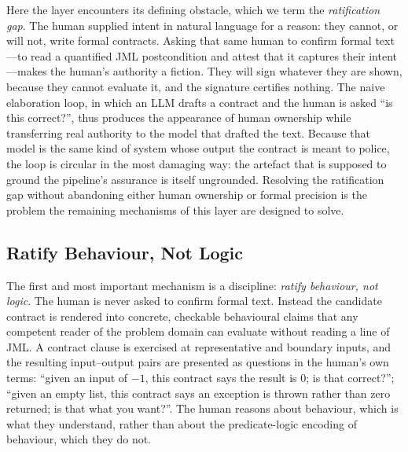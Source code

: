 Here the layer encounters its defining obstacle, which we term the \emph{ratification gap}. The human supplied intent in natural language for a reason: they cannot, or will not, write formal contracts. Asking that same human to confirm formal text---to read a quantified JML postcondition and attest that it captures their intent---makes the human's authority a fiction. They will sign whatever they are shown, because they cannot evaluate it, and the signature certifies nothing. The naive elaboration loop, in which an LLM drafts a contract and the human is asked ``is this correct?'', thus produces the appearance of human ownership while transferring real authority to the model that drafted the text. Because that model is the same kind of system whose output the contract is meant to police, the loop is circular in the most damaging way: the artefact that is supposed to ground the pipeline's assurance is itself ungrounded. Resolving the ratification gap without abandoning either human ownership or formal precision is the problem the remaining mechanisms of this layer are designed to solve.

\subsection{Ratify Behaviour, Not Logic}
\label{subsec:ratify_behavior}

The first and most important mechanism is a discipline: \emph{ratify behaviour, not logic}. The human is never asked to confirm formal text. Instead the candidate contract is rendered into concrete, checkable behavioural claims that any competent reader of the problem domain can evaluate without reading a line of JML. A contract clause is exercised at representative and boundary inputs, and the resulting input--output pairs are presented as questions in the human's own terms: ``given an input of $-1$, this contract says the result is $0$; is that correct?''; ``given an empty list, this contract says an exception is thrown rather than zero returned; is that what you want?''. The human reasons about behaviour, which is what they understand, rather than about the predicate-logic encoding of behaviour, which they do not.

